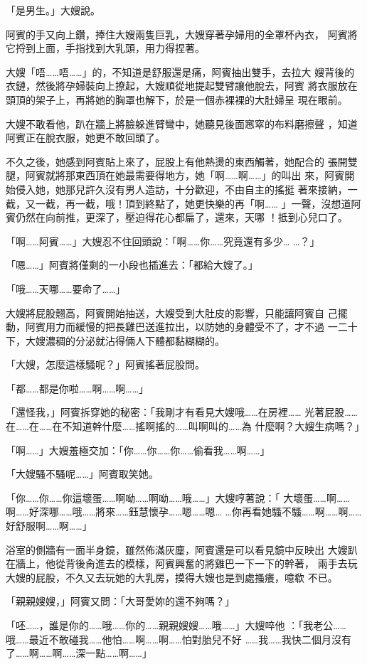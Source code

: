 「是男生。」大嫂說。

阿賓的手又向上鑽，捧住大嫂兩隻巨乳，大嫂穿著孕婦用的全罩杯內衣，
阿賓將它捋到上面，手指找到大乳頭，用力得捏著。

大嫂「唔……唔……」的，不知道是舒服還是痛，阿賓抽出雙手，去拉大
嫂背後的衣鏈，然後將孕婦裝向上撩起，大嫂順從地提起雙臂讓他脫去，阿賓
將衣服放在頭頂的架子上，再將她的胸罩也解下，於是一個赤裸裸的大肚婦呈
現在眼前。

大嫂不敢看他，趴在牆上將臉躲進臂彎中，她聽見後面窸窣的布料磨擦聲
，知道阿賓正在脫衣服，她更不敢回頭了。

不久之後，她感到阿賓貼上來了，屁股上有他熱燙的東西觸著，她配合的
張開雙腿，阿賓就將那東西頂在她最需要得地方，她「啊……啊……」的叫出
來，阿賓開始侵入她，她那兒許久沒有男人造訪，十分歡迎，不由自主的搖挺
著來接納，一截，又一截，再一截，哦！頂到終點了，她更快樂的再「啊……
」一聲，沒想道阿賓仍然在向前推，更深了，壓迫得花心都扁了，還來，天哪
！抵到心兒口了。

「啊……阿賓……」大嫂忍不住回頭說：「啊……你……究竟還有多少…
…？」

「嗯……」阿賓將僅剩的一小段也插進去：「都給大嫂了。」

「哦……天哪……要命了……」

大嫂將屁股翹高，阿賓開始抽送，大嫂受到大肚皮的影響，只能讓阿賓自
己擺動，阿賓用力而緩慢的把長雞巴送進拉出，以防她的身體受不了，才不過
一二十下，大嫂濃稠的分泌就沾得倆人下體都黏糊糊的。

「大嫂，怎麼這樣騷呢？」阿賓搖著屁股問。

「都……都是你啦……啊……啊……」

「還怪我，」阿賓拆穿她的秘密：「我剛才有看見大嫂哦……在房裡……
光著屁股……在……在……在不知道幹什麼……搖啊搖的……叫啊叫的……為
什麼啊？大嫂生病嗎？」

「啊……」大嫂羞極交加：「你……你……你……偷看我……啊……」

「大嫂騷不騷呢……」阿賓取笑她。

「你……你……你這壞蛋……啊呦……啊呦……哦……」大嫂哼著說：「
大壞蛋……啊……啊……好深哪……哦……將來……鈺慧懷孕……嗯……嗯…
…你再看她騷不騷……啊……啊……好舒服啊……啊……」

浴室的側牆有一面半身鏡，雖然佈滿灰塵，阿賓還是可以看見鏡中反映出
大嫂趴在牆上，他從背後肏進去的模樣，阿賓興奮的將雞巴一下一下的幹著，
兩手去玩大嫂的屁股，不久又去玩她的大乳房，摸得大嫂也是到處搔癢，噫欷
不已。

「親親嫂嫂，」阿賓又問：「大哥愛妳的還不夠嗎？」

「呸……，誰是你的……哦……你的……親親嫂嫂……哦……」大嫂啐他
：「我老公……哦……最近不敢碰我……他怕……啊……啊……怕對胎兒不好
……我……我快二個月沒有了……啊……啊……深一點……啊……」

